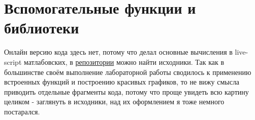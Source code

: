 \chapter{Вспомогательные функции и библиотеки}
\label{ch:chap1}



\lstset{style=mystyle}

Онлайн версию кода здесь нет, потому что делал основные вычисления в live-script матлабовских, в \href{https://github.com/GreedlyCore/fourier_series_course}{репозитории} можно найти исходники. 
Так как в большинстве своём выполнение лабораторной работы сводилось к применению встроенных функций и построению красивых графиков, то не вижу смысла приводить отдельные фрагменты кода, 
потому что проще увидеть всю картину целиком - заглянуть в исходники, над их оформлением я тоже немного постарался.


\endinput